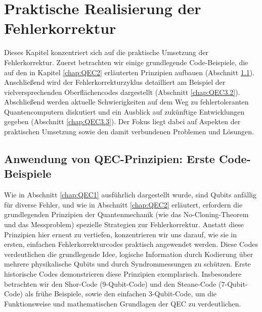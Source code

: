 \section{Praktische Realisierung der Fehlerkorrektur}\label{chap:QEC3}

Dieses Kapitel konzentriert sich auf die praktische Umsetzung der Fehlerkorrektur.
Zuerst betrachten wir einige grundlegende Code-Beispiele, die auf den in Kapitel \ref{chap:QEC2} erläuterten Prinzipien aufbauen (Abschnitt \ref{chap:QEC3.1}). Anschließend wird der Fehlerkorrekturzyklus detailliert am Beispiel der vielversprechenden Oberflächencodes dargestellt (Abschnitt \ref{chap:QEC3.2}). Abschließend werden aktuelle Schwierigkeiten auf dem Weg zu fehlertoleranten Quantencomputern diskutiert und ein Ausblick auf zukünftige Entwicklungen gegeben (Abschnitt \ref{chap:QEC3.3}). Der Fokus liegt dabei auf Aspekten der praktischen Umsetzung sowie den damit verbundenen Problemen und Lösungen.


\subsection{Anwendung von QEC-Prinzipien: Erste Code-Beispiele}\label{chap:QEC3.1}

Wie in Abschnitt \ref{chap:QEC1} ausführlich dargestellt wurde, sind Qubits anfällig für diverse
Fehler, und wie in Abschnitt \ref{chap:QEC2} erläutert, erfordern die grundlegenden Prinzipien der
Quantenmechanik (wie das No-Cloning-Theorem und das Messproblem) spezielle
Strategien zur Fehlerkorrektur. Anstatt diese Prinzipien hier erneut zu vertiefen,
konzentrieren wir uns darauf, wie sie in ersten, einfachen Fehlerkorrekturcodes
praktisch angewendet werden. Diese Codes verdeutlichen die grundlegende Idee,
logische Information durch Kodierung über mehrere physikalische Qubits und durch
Syndrommessungen zu schützen.
Erste historische Codes demonstrieren diese Prinzipien exemplarisch. Insbesondere betrachten wir den Shor-Code (9-Qubit-Code) und den Steane-Code (7-Qubit-Code) als frühe Beispiele, sowie den einfachen 3-Qubit-Code, um die Funktionsweise und mathematischen Grundlagen der QEC zu verdeutlichen.
\cite[Seite 427-430]{nielsen_quantum_2010}\\

